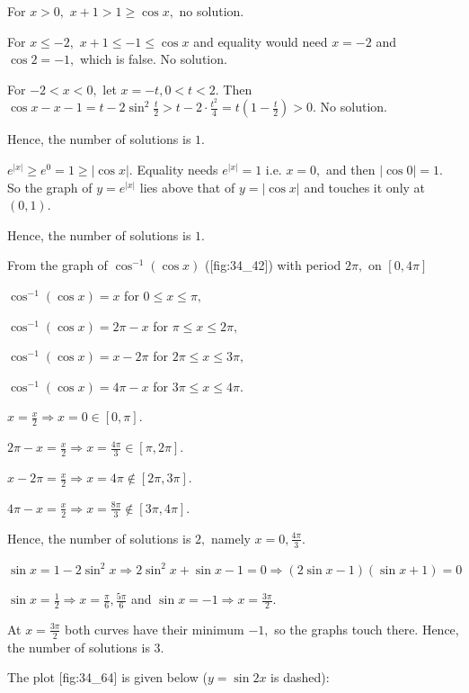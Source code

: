   For $x > 0,$ $x + 1 > 1\geq\cos x,$ no solution.

  For $x\leq -2,$ $x + 1\leq -1\leq\cos x$ and equality would need $x = -2$ and $\cos2 = -1,$ which is false. No
  solution.

  For $-2 < x < 0,$ let $x = -t, 0 < t < 2.$ Then $\cos x - x - 1 = t - 2\sin^2\frac{t}{2} > t - 2\cdot\frac{t^2}{4} =
  t\left(1 - \frac{t}{2}\right) > 0.$ No solution.

  Hence, the number of solutions is $1.$

\item $e^{|x|}\geq e^0 = 1\geq|\cos x|.$ Equality needs $e^{|x|} = 1$ i.e. $x = 0,$ and then $|\cos0| = 1.$ So the
  graph of $y = e^{|x|}$ lies above that of $y = |\cos x|$ and touches it only at $(0, 1).$

  Hence, the number of solutions is $1.$

\item From the graph of $\cos^{-1}(\cos x)$ ([fig:34_42]) with period $2\pi,$ on $[0, 4\pi]$

  $\cos^{-1}(\cos x) = x$ for $0\leq x\leq\pi,$

  $\cos^{-1}(\cos x) = 2\pi - x$ for $\pi\leq x\leq 2\pi,$

  $\cos^{-1}(\cos x) = x - 2\pi$ for $2\pi\leq x\leq 3\pi,$

  $\cos^{-1}(\cos x) = 4\pi - x$ for $3\pi\leq x\leq 4\pi.$

  $x = \frac{x}{2}\Rightarrow x = 0\in[0, \pi].$

  $2\pi - x = \frac{x}{2}\Rightarrow x = \frac{4\pi}{3}\in[\pi, 2\pi].$

  $x - 2\pi = \frac{x}{2}\Rightarrow x = 4\pi\notin[2\pi, 3\pi].$

  $4\pi - x = \frac{x}{2}\Rightarrow x = \frac{8\pi}{3}\notin[3\pi, 4\pi].$

  Hence, the number of solutions is $2,$ namely $x = 0, \frac{4\pi}{3}.$

\item $\sin x = 1 - 2\sin^2x \Rightarrow 2\sin^2x + \sin x - 1 = 0 \Rightarrow (2\sin x - 1)(\sin x + 1) = 0$

  $\sin x = \frac{1}{2}\Rightarrow x = \frac{\pi}{6}, \frac{5\pi}{6}$ and $\sin x = -1\Rightarrow x = \frac{3\pi}{2}.$

  At $x = \frac{3\pi}{2}$ both curves have their minimum $-1,$ so the graphs touch there. Hence, the number of
  solutions is $3.$

\item The plot [fig:34_64] is given below ($y = \sin2x$ is dashed):

